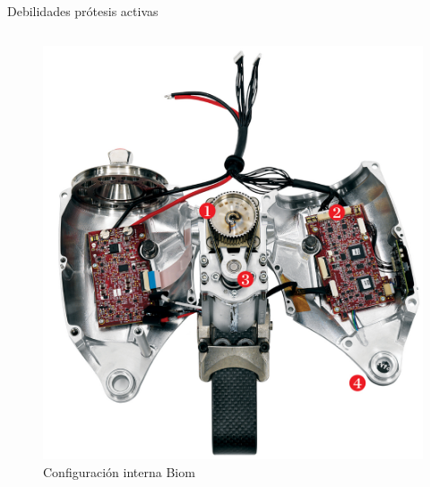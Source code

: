 \documentclass[10pt]{beamer}
\begin{document}
\begin{frame}{Debilidades prótesis activas}
\begin{columns}[t]
\begin{figure}
\begin{centering}
\includegraphics[scale=0.11]{Feathergraphics/Bionaked}
\par\end{centering}
{\scriptsize{}\caption{Configuración interna Biom \cite{boston}}
}{\scriptsize \par}

\end{figure}

\end{columns}

\end{frame}
\end{document}

